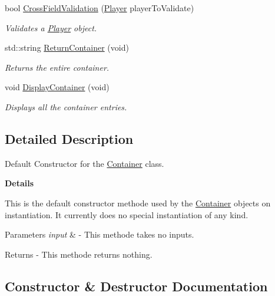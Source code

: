 \begin{DoxyCompactItemize}
bool \hyperlink{class_container_a10e9ba7886699c51a9de5f7c48ba81a8}{Cross\+Field\+Validation} (\hyperlink{class_player}{Player} player\+To\+Validate)
\begin{DoxyCompactList}\small\item\em Validates a \hyperlink{class_player}{Player} object. \end{DoxyCompactList}\item 
std\+::string \hyperlink{class_container_a5a483ed7cdea2dd32b02cf94fd21822a}{Return\+Container} (void)
\begin{DoxyCompactList}\small\item\em Returns the entire container. \end{DoxyCompactList}\item 
void \hyperlink{class_container_aa7aba0b9646397931010aee0da898dda}{Display\+Container} (void)
\begin{DoxyCompactList}\small\item\em Displays all the container entries. \end{DoxyCompactList}\end{DoxyCompactItemize}


\subsection{Detailed Description}
Default Constructor for the \hyperlink{class_container}{Container} class. 

{\bfseries Details}

This is the default constructor methode used by the \hyperlink{class_container}{Container} objects on instantiation. It currently does no special instantiation of any kind.


\begin{DoxyParams}{Parameters}
{\em input} & -\/ This methode takes no inputs.\\
\hline
\end{DoxyParams}
\begin{DoxyReturn}{Returns}
-\/ This methode returns nothing. 
\end{DoxyReturn}


\subsection{Constructor \& Destructor Documentation}
\hypertarget{class_container_ae9f5d07bfc3defda274aa06091c19f56}{}
